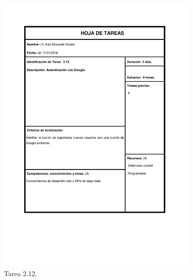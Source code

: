 \documentclass{DeustoFDP}
\begin{document}
\begin{figure}[H]
    \centering
    \includegraphics[width=0.9\textwidth]{fig/Tareas/212}
    \caption{Tarea 2.12.}
    \label{fig:t212}
\end{figure}
\end{document}
